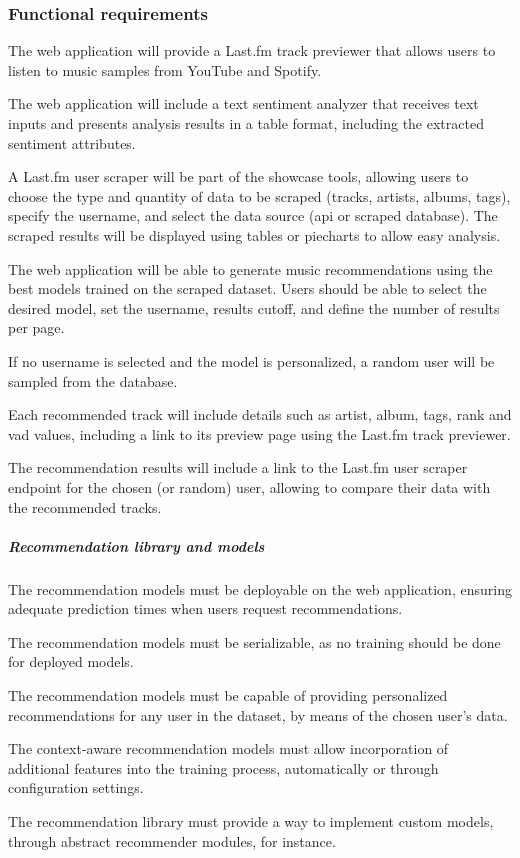 \subsubsection{Functional requirements}
\begin{functionalmod}[WA]
    \item The web application will provide a Last.fm track previewer that allows users to listen to music samples from YouTube and Spotify.
    \item The web application will include a text sentiment analyzer that receives text inputs and presents analysis results in a table format, including the extracted sentiment attributes.
    \item A Last.fm user scraper will be part of the showcase tools, allowing users to choose the type and quantity of data to be scraped (tracks, artists, albums, tags), specify the username, and select the data source (\acs{api} or scraped database). The scraped results will be displayed using tables or piecharts to allow easy analysis.
    \item The web application will be able to generate music recommendations using the best models trained on the scraped dataset. Users should be able to select the desired model, set the username, results cutoff, and define the number of results per page.
    \begin{functionalmod}[WA]
        \item If no username is selected and the model is personalized, a random user will be sampled from the database.
        \item Each recommended track will include details such as artist, album, tags, rank and \acs{vad} values, including a link to its preview page using the Last.fm track previewer.
        \item The recommendation results will include a link to the Last.fm user scraper endpoint for the chosen (or random) user, allowing to compare their data with the recommended tracks.
    \end{functionalmod}
    \setcounter{WAF}{\value{enumi}}
\end{functionalmod}
\subparagraph{Recommendation library and models}
\begin{functionalmod}[WA]
    \setcounter{enumi}{\value{WAF}}
    \item The recommendation models must be deployable on the web application, ensuring adequate prediction times when users request recommendations.
    \item The recommendation models must be serializable, as no training should be done for deployed models.
    \item The recommendation models must be capable of providing personalized recommendations for any user in the dataset, by means of the chosen user's data.
    \item The context-aware recommendation models must allow incorporation of additional features into the training process, automatically or through configuration settings.
    \item The recommendation library must provide a way to implement custom models, through abstract recommender modules, for instance.
\end{functionalmod}

